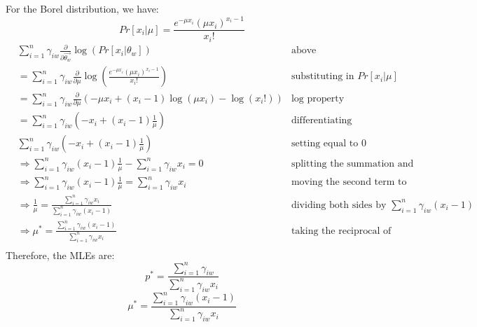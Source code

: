\documentclass[11pt]{article}
\newcommand{\pd}[1]{\frac{\partial}{\partial #1}}
\begin{document}
For the Borel distribution, we have:
\[
	Pr[x_i | \mu] = \frac{e^{-\mu x_i} (\mu x_i)^{x_i - 1}}{x_i!}
\]
\begin{align*}
	& \sum_{i=1}^{n} \gamma_{iw} \pd{\vec{\theta_w}} \log \left( Pr[x_i | \theta_w] \right) & \text{above} \\
	&= \sum_{i=1}^{n} \gamma_{iw} \pd{\mu} \log \left( \frac{e^{-\mu x_i} (\mu x_i)^{x_i - 1}}{x_i!} \right) & \text{substituting in } Pr[x_i | \mu] \\
	&= \sum_{i=1}^{n} \gamma_{iw} \pd{\mu} \left( -\mu x_i + (x_i - 1) \log(\mu x_i) - \log(x_i!) \right) & \text{log property} \\
	&= \sum_{i=1}^{n} \gamma_{iw} \left( -x_i + (x_i - 1) \frac{1}{\mu} \right) & \text{differentiating} \\
	& \sum_{i=1}^{n} \gamma_{iw} \left( -x_i + (x_i - 1) \frac{1}{\mu} \right) & \text{setting equal to } 0 \\
	&\Rightarrow \sum_{i=1}^{n} \gamma_{iw} (x_i - 1)\frac{1}{\mu} - \sum_{i=1}^{n} \gamma_{iw} x_i = 0 & \text{splitting the summation and rearranging} \\
	&\Rightarrow \sum_{i=1}^{n} \gamma_{iw} (x_i - 1)\frac{1}{\mu} = \sum_{i=1}^{n} \gamma_{iw} x_i & \text{moving the second term to the right side} \\
	&\Rightarrow \frac{1}{\mu} = \frac{\sum_{i=1}^{n} \gamma_{iw} x_i}{\sum_{i=1}^{n} \gamma_{iw} (x_i - 1)} & \text{dividing both sides by } \sum_{i=1}^{n} \gamma_{iw} (x_i - 1) \\
	&\Rightarrow \mu^* = \frac{\sum_{i=1}^{n} \gamma_{iw} (x_i - 1)}{\sum_{i=1}^{n} \gamma_{iw} x_i} & \text{taking the reciprocal of both sides} \\
\end{align*}
Therefore, the MLEs are:
\[
	p^* = \frac{\sum_{i=1}^{n} \gamma_{iw}}{\sum_{i = 1}^{n} \gamma_{iw} x_i}
\]
\[
	\mu^* = \frac{\sum_{i=1}^{n} \gamma_{iw} (x_i - 1)}{\sum_{i=1}^{n} \gamma_{iw} x_i}
\]

\newpage
\end{document}
